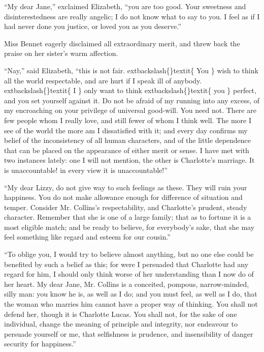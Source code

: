 \documentclass[10pt]{book}
\begin{document}
   “My dear Jane,” exclaimed Elizabeth, “you are too good. Your sweetness
and disinterestedness are really angelic; I do not know what to say to
you. I feel as if I had never done you justice, or loved you as you
deserve.”
  

   Miss Bennet eagerly disclaimed all extraordinary merit, and threw back
the praise on her sister’s warm affection.
  

   “Nay,” said Elizabeth, “this is not fair.
   	extbackslash\{\}textit\{
    You
   \}
   wish to think all the
world respectable, and are hurt if I speak ill of anybody.
   	extbackslash\{\}textit\{
    I
   \}
   only want
to think
   	extbackslash\{\}textit\{
    you
   \}
   perfect, and you set yourself against it. Do not be
afraid of my running into any excess, of my encroaching on your
privilege of universal good-will. You need not. There are few people
whom I really love, and still fewer of whom I think well. The more I see
of the world the more am I dissatisfied with it; and every day confirms
my belief of the inconsistency of all human characters, and of the
little dependence that can be placed on the appearance
   of either merit
or sense. I have met with two instances lately: one I will not mention,
the other is Charlotte’s marriage. It is unaccountable! in every view it
is unaccountable!”
  

   “My dear Lizzy, do not give way to such feelings as these. They will
ruin your happiness. You do not make allowance enough for difference of
situation and temper. Consider Mr. Collins’s respectability, and
Charlotte’s prudent, steady character. Remember that she is one of a
large family; that as to fortune it is a most eligible match; and be
ready to believe, for everybody’s sake, that she may feel something like
regard and esteem for our cousin.”
  

   “To oblige you, I would try to believe almost anything, but no one else
could be benefited by such a belief as this; for were I persuaded that
Charlotte had any regard for him, I should only think worse of her
understanding than I now do of her heart. My dear Jane, Mr. Collins is a
conceited, pompous, narrow-minded, silly man: you know he is, as well as
I do; and you must feel, as well as I do, that the woman who marries him
cannot have a proper way of thinking. You shall not defend her, though
it is Charlotte Lucas. You shall not, for the sake of one individual,
change the meaning of principle and integrity, nor endeavour to persuade
yourself or me, that selfishness is prudence, and insensibility of
danger security for happiness.”
  
\end{document}
